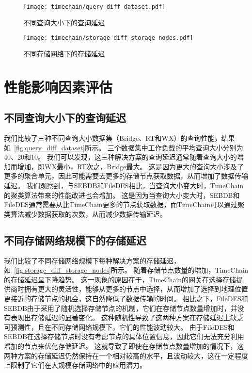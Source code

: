 \begin{figure}[t]
    \centering
	\begin{minipage}{0.45\linewidth}
        \centering
        \texttt{[image: timechain/query\_diff\_dataset.pdf]}
        \caption{不同查询大小下的查询延迟}
        \label{fig:query_diff_dataset}
	\end{minipage}
	\quad
	\begin{minipage}{0.45\linewidth}
        \centering
        \texttt{[image: timechain/storage\_diff\_storage\_nodes.pdf]}
        \caption{不同存储网络下的存储延迟}
        \label{fig:storage_diff_storage_nodes}
    \end{minipage}
\end{figure}

\section{性能影响因素评估}
\subsection{不同查询大小下的查询延迟}
我们比较了三种不同查询大小数据集（Bridge、RT和WX）的查询性能，结果如~\autoref{fig:query_diff_dataset}所示。
三个数据集中工作负载的平均查询大小分别为40、20和10。
我们可以发现，这三种解决方案的查询延迟通常随着查询大小的增加而增加，即WX最小，RT次之，Bridge最大。
这是因为更大的查询大小涉及了更多的聚合单元，因此可能需要去更多的存储节点获取数据，从而增加了数据传输延迟。
我们观察到，与SEBDB和FileDES相比，当查询大小变大时，TimeChain的聚类算法带来的性能改进也会增加。
这是因为当查询大小变大时，SEBDB和FileDES通常需要从比TimeChain更多的节点获取数据，而TimeChain可以通过聚类算法减少数据获取的次数，从而减少数据传输延迟。

\subsection{不同存储网络规模下的存储延迟}
我们比较了不同存储网络规模下每种解决方案的存储延迟，如~\autoref{fig:storage_diff_storage_nodes}所示。
随着存储节点数量的增加，TimeChain的存储延迟呈下降趋势。
这一现象的原因在于，TimeChain的网关在选择存储提供商时拥有更大的灵活性，能够从更多的节点中选择，从而增加了选择到地理位置更接近的存储节点的机会，这自然降低了数据传输的时间。
相比之下，FileDES和SEBDB由于采用了随机选择存储节点的机制，它们在存储节点数量增加时，并没有表现出存储延迟的显著变化。
这种随机性导致了这两种方案在存储延迟上缺乏可预测性，且在不同存储网络规模下，它们的性能波动较大。
由于FileDES和SEBDB在选择存储节点时没有考虑节点的具体位置信息，因此它们无法充分利用增加的节点来优化存储延迟。
这就导致了即使在存储节点数量增加的情况下，这两种方案的存储延迟仍然保持在一个相对较高的水平，且波动较大，这在一定程度上限制了它们在大规模存储网络中的应用潜力。

